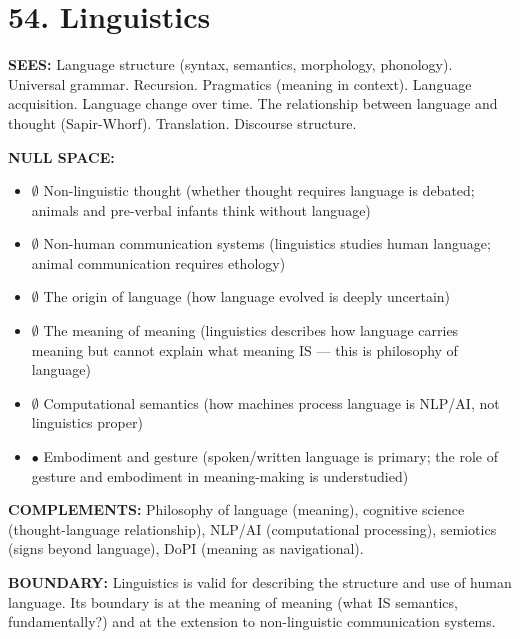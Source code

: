 \bigskip\noindent\makebox[\textwidth]{\color{rulegray}\rule{5cm}{0.3pt}}\bigskip


\section*{54. Linguistics}


\textbf{SEES:} Language structure (syntax, semantics, morphology, phonology). Universal grammar. Recursion. Pragmatics (meaning in context). Language acquisition. Language change over time. The relationship between language and thought (Sapir-Whorf). Translation. Discourse structure.


\textbf{NULL SPACE:}

\begin{itemize}[nosep,leftmargin=*]
  \item $\emptyset$ Non-linguistic thought (whether thought requires language is debated; animals and pre-verbal infants think without language)
  \item $\emptyset$ Non-human communication systems (linguistics studies human language; animal communication requires ethology)
  \item $\emptyset$ The origin of language (how language evolved is deeply uncertain)
  \item $\emptyset$ The meaning of meaning (linguistics describes how language carries meaning but cannot explain what meaning IS — this is philosophy of language)
  \item $\emptyset$ Computational semantics (how machines process language is NLP/AI, not linguistics proper)
  \item $\bullet$ Embodiment and gesture (spoken/written language is primary; the role of gesture and embodiment in meaning-making is understudied)
\end{itemize}


\textbf{COMPLEMENTS:} Philosophy of language (meaning), cognitive science (thought-language relationship), NLP/AI (computational processing), semiotics (signs beyond language), DoPI (meaning as navigational).


\textbf{BOUNDARY:} Linguistics is valid for describing the structure and use of human language. Its boundary is at the meaning of meaning (what IS semantics, fundamentally?) and at the extension to non-linguistic communication systems.


